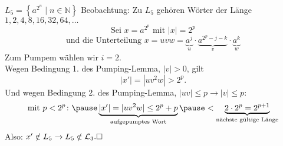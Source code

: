 \documentclass[]{beamer}
\begin{document}
\begin{frame}[squeeze]{}
  \begin{exampleblock}{$L_5 = \left\{a^{2^n} \;|\; n \in \mathbb{N}\right\}$}
    Beobachtung: Zu $L_5$ gehören Wörter der Länge $1, 2, 4, 8, 16, 32, 64, \ldots$
    \pause
    \[\text{Sei } x = a^{2^p} \text{ mit } |x| = 2^p\]
    \pause
    \vspace*{-1.5em}
    \[\text{und die Unterteilung } x = uvw = \underbrace{a^j}_u \cdot \underbrace{a^{2^p-j-k}}_v \cdot \underbrace{a^k}_w\]
    \pause
    Zum Pumpem wählen wir $i = 2$. \\
    \pause 
    Wegen Bedingung 1. des Pumping-Lemma, $|v| > 0$, gilt
    \pause
    \[|x'| = |uv^2w| > 2^p.\]
    \pause
    Und wegen Bedingung 2. des Pumping-Lemma, $|uv| \leq p \to |v| \leq p$:
    \pause
    \[\text{mit } p < 2^p\colon \pause \underbrace{|x'| = |uv^2w| \leq 2^p + p}_{\text{aufgepumptes Wort}} \pause < \underbrace{2 \cdot 2^p = 2^{p+1}}_\text{nächste gültige Länge}\]
    \pause
    Also: $x' \notin L_5 \to L_5 \notin \mathcal{L}_3. \hfill \square$
  \end{exampleblock}
\end{frame}
\end{document}
